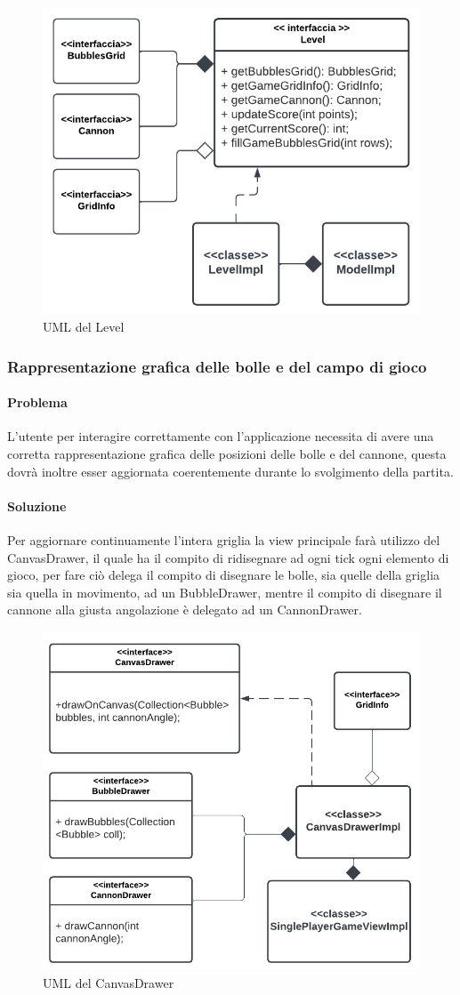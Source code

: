 \documentclass[a4paper,12pt]{report}
\begin{document}
\begin{figure}[H]
	\centering{}
	\includegraphics[width=.7\textwidth]{img/level.pdf}
	\caption{UML del Level}
\end{figure}

\subsubsection{Rappresentazione grafica delle bolle e del campo di gioco}

\paragraph{Problema} L'utente per interagire correttamente con l'applicazione necessita di avere una corretta rappresentazione grafica delle posizioni delle bolle e del cannone,
questa dovrà inoltre esser aggiornata coerentemente durante lo svolgimento della partita.

\paragraph{Soluzione} Per aggiornare continuamente l'intera griglia la view principale farà utilizzo del CanvasDrawer, il quale ha il compito di ridisegnare ad ogni tick 
ogni elemento di gioco, per fare ciò delega il compito di disegnare le bolle, sia quelle della griglia sia quella in movimento, ad un BubbleDrawer, mentre il compito
di disegnare il cannone alla giusta angolazione è delegato ad un CannonDrawer.

\begin{figure}[H]
	\centering{}
	\includegraphics[width=.7\textwidth]{img/drawers.pdf}
	\caption{UML del CanvasDrawer}
\end{figure}
\end{document}
